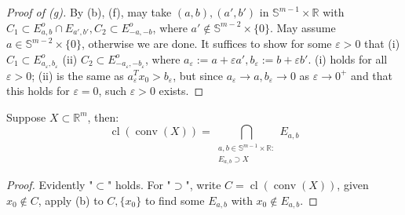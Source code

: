 \begin{proof}[Proof of (g)]
	By (b), (f), may take $(a,b),(a',b')$ in $\mathbb{S}^{m-1}\times \mathbb{R}$ with $C_1\subset E^o_{a,b}\cap E_{a',b'},C_2\subset E^o_{-a,-b}$, where $a'\notin \mathbb{S}^{m-2}\times \{0\}$. May assume $a\in \mathbb{S}^{m-2}\times \{0\}$, otherwise we are done. It suffices to show for some $\varepsilon >0$ that (i) $C_1\subset E^o_{a_\varepsilon,b_\varepsilon}$ (ii) $C_2\subset E^o_{-a_\varepsilon,-b_\varepsilon}$, where $a_\varepsilon:=a+\varepsilon a',b_\varepsilon:=b+\varepsilon b'$. (i) holds for all $\varepsilon >0$; (ii) is the same as $a_\varepsilon^T x_0>b_\varepsilon $, but since $a_\varepsilon\to a,b_\varepsilon \to 0$ as $\varepsilon \to 0^+$ and that this holds for $\varepsilon =0$, such $\varepsilon >0$ exists.
\end{proof}

\begin{coro}\label{coro:014-halfspaces-intersection}
	Suppose $X\subset \mathbb{R}^m$, then:
	\[
		\operatorname{cl}(\operatorname{conv}(X))=\bigcap_{\substack{a,b\in \mathbb{S}^{m-1}\times \mathbb{R}:\\E_{a,b}\supset X}}E_{a,b}
	\]
\end{coro}
\begin{proof}
	Evidently "$\subset$" holds. For "$\supset$", write $C=\operatorname{cl}(\operatorname{conv}(X))$, given $x_0\notin C$, apply (b) to $C,\{x_0\}$ to find some $E_{a,b}$ with $x_0\notin E_{a,b}$.
\end{proof}
